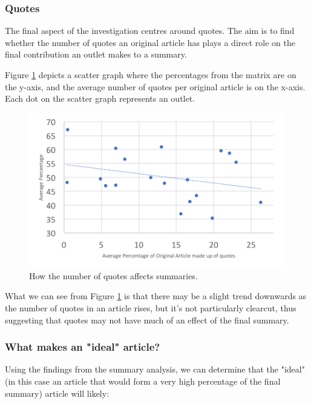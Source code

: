 \documentclass[12pt]{article}
\begin{document}
\subsubsection{Quotes}

The final aspect of the investigation centres around quotes. The aim is to find whether the number of quotes an original article has plays a direct role on the final contribution an outlet makes to a summary.

Figure \ref{quotes} depicts a scatter graph where the percentages from the matrix are on the y-axis, and the average number of quotes per original article is on the x-axis. Each dot on the scatter graph represents an outlet.

\begin{figure}[ht!]
  \centering
    \includegraphics[scale=0.6]{quotes.png}
   \caption[A graph depicting responses to the User Interface Survey]{How the number of quotes affects summaries.}
   \label{quotes}
\end{figure}

What we can see from Figure \ref{quotes} is that there may be a slight trend downwards as the number of quotes in an article rises, but it's not particularly clearcut, thus suggesting that quotes may not have much of an effect of the final summary. 

\subsubsection{What makes an "ideal" article?}

Using the findings from the summary analysis, we can determine that the "ideal" (in this case an article that would form a very high percentage of the final summary) article will likely:
\end{document}
